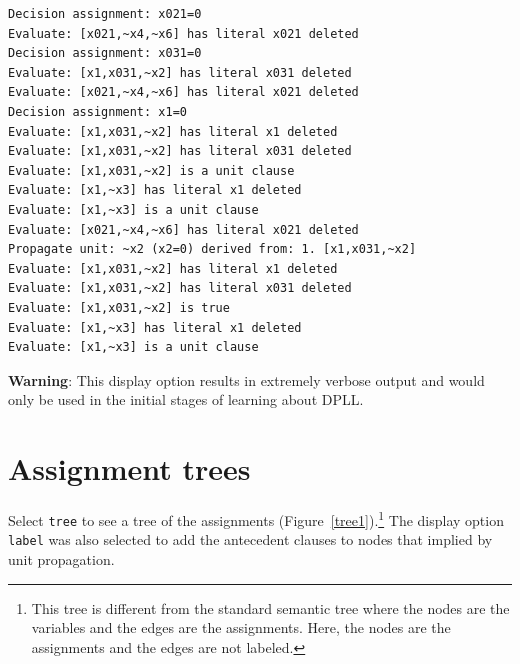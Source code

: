 \documentclass[11pt]{report}
\newcommand*{\p}[1]{\textup{\texttt{#1}}}
\begin{document}
\begin{itemize}
\begin{verbatim}
Decision assignment: x021=0
Evaluate: [x021,~x4,~x6] has literal x021 deleted
Decision assignment: x031=0
Evaluate: [x1,x031,~x2] has literal x031 deleted
Evaluate: [x021,~x4,~x6] has literal x021 deleted
Decision assignment: x1=0
Evaluate: [x1,x031,~x2] has literal x1 deleted
Evaluate: [x1,x031,~x2] has literal x031 deleted
Evaluate: [x1,x031,~x2] is a unit clause
Evaluate: [x1,~x3] has literal x1 deleted
Evaluate: [x1,~x3] is a unit clause
Evaluate: [x021,~x4,~x6] has literal x021 deleted
Propagate unit: ~x2 (x2=0) derived from: 1. [x1,x031,~x2]
Evaluate: [x1,x031,~x2] has literal x1 deleted
Evaluate: [x1,x031,~x2] has literal x031 deleted
Evaluate: [x1,x031,~x2] is true
Evaluate: [x1,~x3] has literal x1 deleted
Evaluate: [x1,~x3] is a unit clause
\end{verbatim}
\textbf{Warning}: This display option results in extremely verbose output
and would only be used in the initial stages of learning about DPLL.

\end{itemize}

\newpage

\section{Assignment trees}

Select \p{tree} to see a tree of the assignments
(Figure~\ref{tree1}).\footnote{This tree is different from the standard
semantic tree where the nodes are the variables and the edges are the
assignments. Here, the nodes are the assignments and the edges are not
labeled.} The display option \p{label} was also selected to add the
antecedent clauses to nodes that implied by unit propagation.
\end{document}
